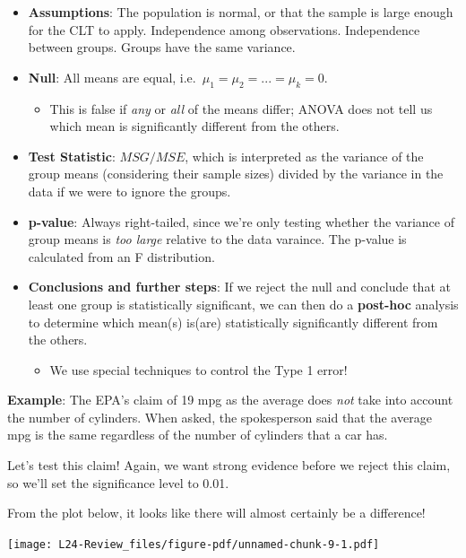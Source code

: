 \documentclass[
  letterpaper,
  DIV=11,
  numbers=noendperiod,
  oneside]{scrreprt}
\providecommand{\tightlist}{%
  \setlength{\itemsep}{0pt}\setlength{\parskip}{0pt}}\usepackage{longtable,booktabs,array}
\begin{document}
\begin{itemize}
\tightlist
\item
  \textbf{Assumptions}: The population is normal, or that the sample is
  large enough for the CLT to apply. Independence among observations.
  Independence between groups. Groups have the same variance.
\item
  \textbf{Null}: All means are equal,
  i.e.~\(\mu_1 = \mu_2 = ... = \mu_k = 0\).

  \begin{itemize}
  \tightlist
  \item
    This is false if \emph{any} or \emph{all} of the means differ; ANOVA
    does not tell us which mean is significantly different from the
    others.
  \end{itemize}
\item
  \textbf{Test Statistic}: \(MSG/MSE\), which is interpreted as the
  variance of the group means (considering their sample sizes) divided
  by the variance in the data if we were to ignore the groups.
\item
  \textbf{p-value}: Always right-tailed, since we're only testing
  whether the variance of group means is \emph{too large} relative to
  the data varaince. The p-value is calculated from an F distribution.
\item
  \textbf{Conclusions and further steps}: If we reject the null and
  conclude that at least one group is statistically significant, we can
  then do a \textbf{post-hoc} analysis to determine which mean(s)
  is(are) statistically significantly different from the others.

  \begin{itemize}
  \tightlist
  \item
    We use special techniques to control the Type 1 error!
  \end{itemize}
\end{itemize}

\textbf{Example}: The EPA's claim of 19 mpg as the average does
\emph{not} take into account the number of cylinders. When asked, the
spokesperson said that the average mpg is the same regardless of the
number of cylinders that a car has.

Let's test this claim! Again, we want strong evidence before we reject
this claim, so we'll set the significance level to 0.01.

From the plot below, it looks like there will almost certainly be a
difference!

\texttt{[image: L24-Review\_files/figure-pdf/unnamed-chunk-9-1.pdf]}
\end{document}
